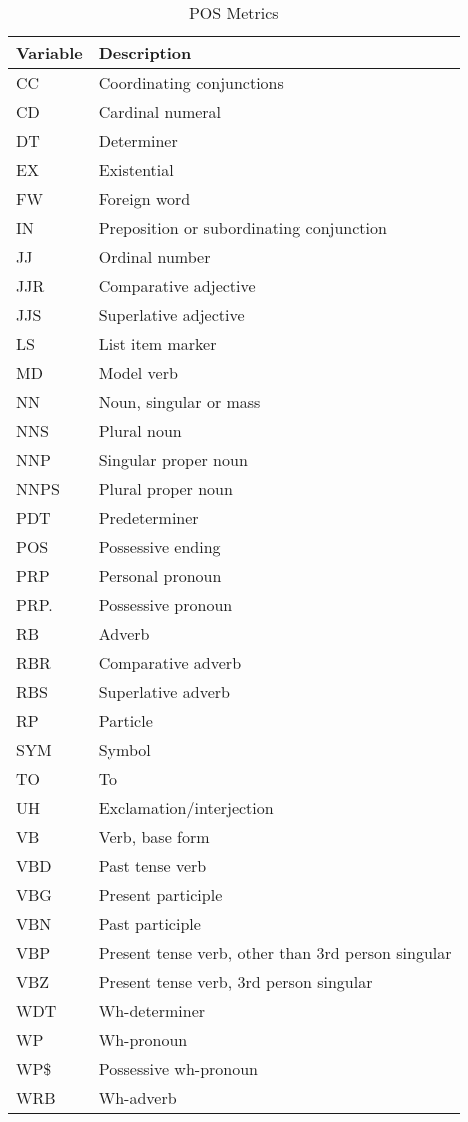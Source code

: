 \documentclass[../thesis.tex]{subfiles}
\begin{document}
\begin{longtable}[t]{ll}
\caption{\label{tab:}POS Metrics}\\
\toprule
Variable & Description\\
\midrule
CC & Coordinating conjunctions\\
CD & Cardinal numeral\\
DT & Determiner\\
EX & Existential\\
FW & Foreign word\\
\addlinespace
IN & Preposition or subordinating conjunction\\
JJ & Ordinal number\\
JJR & Comparative adjective\\
JJS & Superlative adjective\\
LS & List item marker\\
\addlinespace
MD & Model verb\\
NN & Noun, singular or mass\\
NNS & Plural noun\\
NNP & Singular proper noun\\
NNPS & Plural proper noun\\
\addlinespace
PDT & Predeterminer\\
POS & Possessive ending\\
PRP & Personal pronoun\\
PRP. & Possessive pronoun\\
RB & Adverb\\
\addlinespace
RBR & Comparative adverb\\
RBS & Superlative adverb\\
RP & Particle\\
SYM & Symbol\\
TO & To\\
\addlinespace
UH & Exclamation/interjection\\
VB & Verb, base form\\
VBD & Past tense verb\\
VBG & Present participle\\
VBN & Past participle\\
\addlinespace
VBP & Present tense verb, other than 3rd person singular\\
VBZ & Present tense verb, 3rd person singular\\
WDT & Wh-determiner\\
WP & Wh-pronoun\\
WP\$ & Possessive wh-pronoun\\
\addlinespace
WRB & Wh-adverb\\
\bottomrule
\end{longtable}
\end{document}
